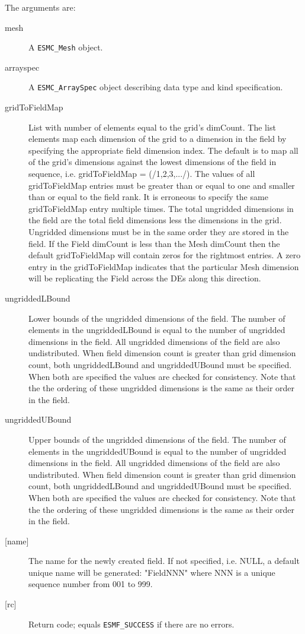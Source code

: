     The arguments are:
    \begin{description}
    \item[mesh]
      A {\tt ESMC\_Mesh} object.
    \item[arrayspec]
      A {\tt ESMC\_ArraySpec} object describing data type and kind specification.
    \item[gridToFieldMap]
      List with number of elements equal to the grid's dimCount. The list
      elements map each dimension of the grid to a dimension in the field by
      specifying the appropriate field dimension index. The default is to map all of
      the grid's dimensions against the lowest dimensions of the field in sequence,
      i.e. gridToFieldMap = (/1,2,3,.../). The values of all gridToFieldMap entries
      must be greater than or equal to one and smaller than or equal to the field
      rank. It is erroneous to specify the same gridToFieldMap entry multiple times.
      The total ungridded dimensions in the field  are the total field dimensions
      less the dimensions in the grid. Ungridded dimensions must be in the same order
      they are stored in the field. If the Field dimCount is less than the Mesh
      dimCount then the default gridToFieldMap will contain zeros for the rightmost
      entries. A zero entry in the gridToFieldMap indicates that the particular Mesh
      dimension will be replicating the Field across the DEs along this direction.
    \item[ungriddedLBound]
      Lower bounds of the ungridded dimensions of the field. The number of elements
      in the ungriddedLBound is equal to the number of ungridded dimensions in the
      field. All ungridded dimensions of the field are also undistributed. When field
      dimension count is greater than grid dimension count, both ungriddedLBound and
      ungriddedUBound must be specified. When both are specified the values are
      checked for consistency. Note that the the ordering of these ungridded
      dimensions is the same as their order in the field.  
    \item[ungriddedUBound]
      Upper bounds of the ungridded dimensions of the field. The number of elements
      in the ungriddedUBound is equal to the number of ungridded dimensions in the
      field. All ungridded dimensions of the field are also undistributed. When field
      dimension count is greater than grid dimension count, both ungriddedLBound and
      ungriddedUBound must be specified. When both are specified the values are
      checked for consistency. Note that the the ordering of these ungridded
      dimensions is the same as their order in the field.  
    \item[{[name]}]
      The name for the newly created field.  If not specified, i.e. NULL,
      a default unique name will be generated: "FieldNNN" where NNN
      is a unique sequence number from 001 to 999.
    \item[{[rc]}]
      Return code; equals {\tt ESMF\_SUCCESS} if there are no errors.
    \end{description}
   
